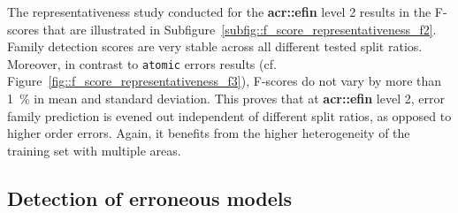         The representativeness study conducted for the \textbf{\gls{acr::efin}} level 2 results in the F-scores that are illustrated in Subfigure~\ref{subfig::f_score_representativeness_f2}.
        Family detection scores are very stable across all different tested split ratios.
        Moreover, in contrast to \texttt{atomic} errors results (cf. Figure~\ref{fig::f_score_representativeness_f3}), F-scores do not vary by more than \SI{1}{\percent} in mean and standard deviation.
        This proves that at \textbf{\gls{acr::efin}} level 2, error family prediction is evened out independent of different split ratios, as opposed to higher order errors.
        Again, it benefits from the higher heterogeneity of the training set with multiple areas.
    
    \subsection{Detection of erroneous models}
        \label{subsec::more_experiments::finesse::1}
